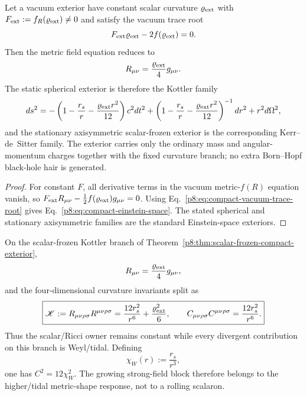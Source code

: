 \documentclass[12pt,a4paper]{article}
\begin{document}
\begin{theorem}
\label{p8:thm:scalar-frozen-compact-exterior}
Let a vacuum exterior have constant scalar curvature $\varrho_{\rm ext}$ with
$F_{\rm ext}:=f_R(\varrho_{\rm ext})\ne0$ and satisfy the vacuum trace root
\begin{equation}
\label{p8:eq:compact-vacuum-trace-root}
 F_{\rm ext}\varrho_{\rm ext}-2f(\varrho_{\rm ext})=0.
\end{equation}
Then the metric field equation reduces to
\begin{equation}
\label{p8:eq:compact-einstein-space}
 R_{\mu\nu}=\frac{\varrho_{\rm ext}}4g_{\mu\nu}.
\end{equation}
The static spherical exterior is therefore the Kottler family
\begin{equation}
\label{p8:eq:compact-kottler}
 ds^2=-\left(1-\frac{r_s}{r}-\frac{\varrho_{\rm ext}r^2}{12}\right)c^2dt^2
 +\left(1-\frac{r_s}{r}-\frac{\varrho_{\rm ext}r^2}{12}\right)^{-1}dr^2
 +r^2d\Omega^2,
\end{equation}
and the stationary axisymmetric scalar-frozen exterior is the corresponding
Kerr--de~Sitter family.  The exterior carries only the ordinary mass and
angular-momentum charges together with the fixed curvature branch; no extra
Born--Hopf black-hole hair is generated.
\end{theorem}

\begin{proof}
For constant $F$, all derivative terms in the vacuum metric-$f(R)$ equation
vanish, so
$F_{\rm ext}R_{\mu\nu}-\tfrac12f(\varrho_{\rm ext})g_{\mu\nu}=0$.
Using Eq.~\eqref{p8:eq:compact-vacuum-trace-root} gives
Eq.~\eqref{p8:eq:compact-einstein-space}.  The stated spherical and stationary
axisymmetric families are the standard Einstein-space exteriors.
\end{proof}

\begin{proposition}
\label{p8:prop:kottler-weyl-tidal-growth}
On the scalar-frozen Kottler branch of
Theorem~\ref{p8:thm:scalar-frozen-compact-exterior},
\[
 R_{\mu\nu}=\frac{\varrho_{\rm ext}}4g_{\mu\nu},
\]
and the four-dimensional curvature invariants split as
\begin{equation}
\label{p8:eq:kottler-weyl-split}
 \boxed{
 \mathscr K:=R_{\mu\nu\rho\sigma}R^{\mu\nu\rho\sigma}
 =\frac{12r_s^2}{r^6}+\frac{\varrho_{\rm ext}^2}{6},\qquad
 C_{\mu\nu\rho\sigma}C^{\mu\nu\rho\sigma}
 =\frac{12r_s^2}{r^6}.}
\end{equation}
Thus the scalar/Ricci owner remains constant while every divergent contribution
on this branch is Weyl/tidal.  Defining
\[
 \boxed{\chi_W(r):=\frac{r_s}{r^3}},
\]
one has \(C^2=12\chi_W^2\).  The growing strong-field block therefore belongs
to the higher/tidal metric-shape response, not to a rolling scalaron.
\end{proposition}
\end{document}

